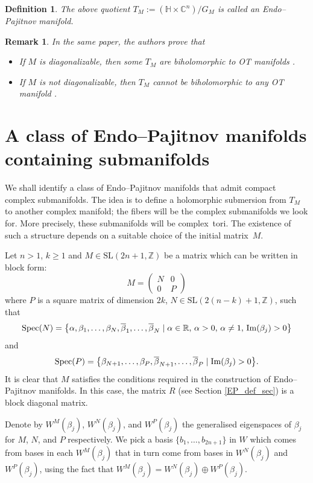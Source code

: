 \documentclass[pdftex]{sigma}
\newcommand{\6}{\partial}
\renewcommand{\Im}{\operatorname{Im}}
\numberwithin{equation}{section}
\newtheorem{Definition}[Theorem]{Definition}
\newtheorem{Remark}[Theorem]{Remark}
\begin{document}
\begin{Definition}
The above quotient $T_M:= (\mathbb{H} \times \mathbb{C}^n)/G_M$ is called an \emph{Endo--Pajitnov manifold}.
\end{Definition}

\begin{Remark}
In the same paper, the authors prove that
\begin{itemize}\itemsep=0pt
\item If $M$ is diagonalizable, then some $T_M$ are biholomorphic to OT manifolds \cite[Proposition~5.3]{pajitnov1}.
\item If $M$ is not diagonalizable, then $T_M$ cannot be biholomorphic to any OT manifold \cite[Proposition~5.6]{pajitnov1}.
\end{itemize}
\end{Remark}

\section{A class of Endo--Pajitnov manifolds containing submanifolds}

We shall identify a class of Endo--Pajitnov manifolds that admit compact complex submanifolds. The idea is to define a holomorphic submersion from $T_M$ to another complex manifold; the fibers will be the complex submanifolds we look for. More precisely, these submanifolds will be complex~tori.
The existence of such a structure depends on a suitable choice of the initial matrix~$M$.

Let $n > 1$, $k \geq 1$ and $M \in \textrm{SL}(2n+1, \mathbb{Z})$ be a matrix which can be written in block form:
\[
M = \begin{pmatrix}
N & 0 \\
0 & P
\end{pmatrix}
\]
where \( P \) is a square matrix of dimension \( 2k \), \( N \in \textrm{SL}(2(n-k)+1, \mathbb{Z}) \), such that
\[
{\rm Spec}(N) = \bigl\{ \alpha, \beta_1, \dots, \beta_N, \overline{\beta}_1, \dots, \overline{\beta}_N \mid \alpha \in \mathbb{R},\, \alpha > 0,\, \alpha \neq 1,\, \Im(\beta_j) > 0 \bigr\}
\]
and
\[
{\rm Spec}(P) = \bigl\{ \beta_{N+1}, \dots, \beta_{P}, \overline{\beta}_{N+1}, \dots, \overline{\beta}_{P} \mid \Im(\beta_j) > 0 \bigr\}.
\]
It is clear that $M$ satisfies the conditions required in the construction of Endo--Pajitnov manifolds.
In this case, the matrix $R$ (see Section \ref{EP_def_sec}) is a block diagonal matrix.

Denote by $W^M(\beta_j)$, $W^N(\beta_j)$, and $W^P(\beta_j)$ the generalised eigenspaces of $\beta_j$ for $M$, $N$, and $P$ respectively. We pick a basis $\{ b_1, \dots, b_{2n+1} \}$ in $W$ which comes from bases in each $W^M(\beta_j)$ that in turn come from bases in $W^N(\beta_j)$ and $W^P(\beta_j)$, using the fact that $W^M(\beta_j) = W^N(\beta_j) \oplus W^P(\beta_j)$.
\end{document}
